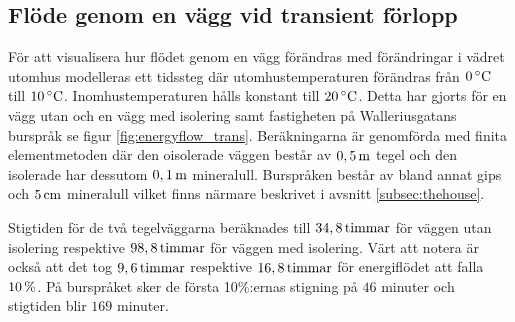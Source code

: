 \subsection{Flöde genom en vägg vid transient förlopp}


För att visualisera hur flödet genom en vägg förändras med
förändringar i vädret utomhus modelleras ett tidssteg där utomhustemperaturen förändras från
$\unit[0]{^\circ C}$ till $\unit[10]{^\circ C}$. Inomhustemperaturen hålls konstant till $\unit[20]{^\circ C}$.
Detta har gjorts för en vägg utan och en vägg med isolering samt fastigheten på Walleriusgatans burspråk
se figur \ref{fig:energyflow_trans}. Beräkningarna är genomförda med finita elementmetoden
där den oisolerade väggen består av $\unit[0,5]{m}$ tegel och den isolerade har dessutom $\unit[0,1]{m}$ mineralull. Burspråken
består av bland annat gips och $\unit[5]{cm}$ mineralull vilket finns närmare beskrivet i avsnitt \ref{subsec:thehouse}.

Stigtiden för de två tegelväggarna beräknades till $\unit[34,8]{timmar}$ för väggen utan isolering
respektive $\unit[98,8]{timmar}$ för väggen med isolering. 
Värt att notera är också att det tog $\unit[9,6]{timmar}$ respektive $\unit[16,8]{timmar}$ för energiflödet att falla $\unit[10]{\%}$. 
På burspråket sker de första 10\%:ernas stigning på $46$ minuter och stigtiden blir $169$ minuter.

